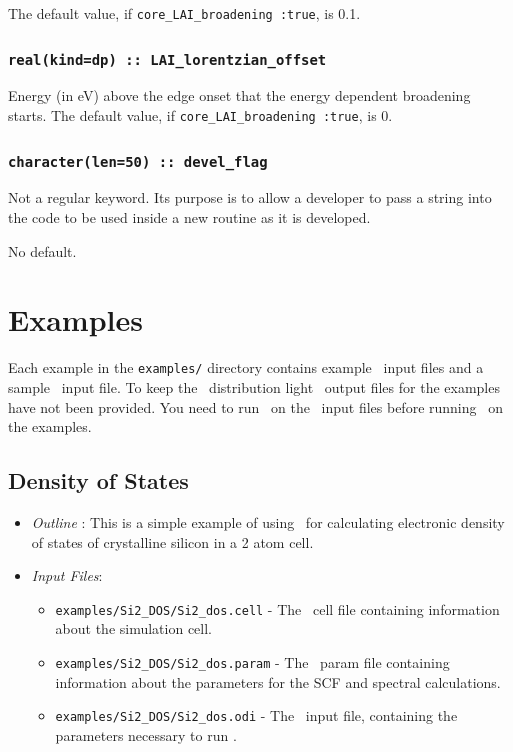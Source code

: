 \documentclass[a4paper,11pt,twoside]{book}
\begin{document}
{The default value, if \verb#core_LAI_broadening :true#, is 0.1. 

\subsection[core\_lorentzian\_offset]{\tt real(kind=dp) :: LAI\_lorentzian\_offset}
Energy (in eV) above the edge onset that the energy dependent broadening starts.  
The default value, if \verb#core_LAI_broadening :true#, is 0.



\subsection[devel\_flag]{\tt character(len=50) :: devel\_flag}

Not a regular keyword. Its purpose is to allow a developer to pass a
string into the code to be used inside a new routine as it is developed.

No default.



\chapter{Examples}

Each example in the \verb#examples/# directory contains example \castep\ input files and a sample \optados\ input file. To keep the \optados\ distribution light \castep\ output files for the examples have not been provided. You need to run \castep\ on the \castep\ input files before running \optados\ on the examples.

\section{Density of States}
\begin{itemize}
\item \emph{Outline} : This is a simple example of using \optados\ for calculating electronic density of states of crystalline silicon in a 2 atom cell.
\item \emph{Input Files}:
\begin{itemize}
\item \verb#examples/Si2_DOS/Si2_dos.cell# - The \castep\ cell file containing information about the simulation cell.
\item \verb#examples/Si2_DOS/Si2_dos.param# - The \castep\ param file containing information about the parameters for the SCF and spectral calculations.
\item \verb#examples/Si2_DOS/Si2_dos.odi# - The \optados\ input file, containing the parameters necessary to run \optados.
\end{itemize}
\end{itemize}

}
\end{document}
